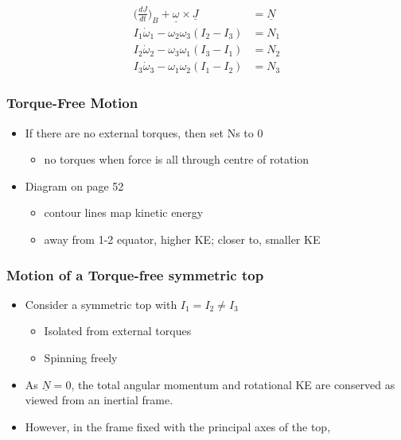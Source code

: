 \documentclass[a4paper,11pt,normalem]{article}
\begin{document}
\[
    \begin{aligned}
    \Big(\frac{d\underline{J}}{dt}\Big)_{B} + \underline{\omega_{}} \times \underline{J} &= \underline{N} \\
    I_1\dot{\omega}_1 - \omega_2\omega_3(I_2 - I_3) &= N_1 \\
    I_2\dot{\omega}_2 - \omega_3\omega_1(I_3 - I_1) &= N_2 \\
    I_3\dot{\omega}_3 - \omega_1\omega_2(I_1 - I_2) &= N_3
    \end{aligned}
\]

\subsubsection{Torque-Free Motion}\label{torque-free-motion}

\begin{itemize}
\item
  If there are no external torques, then set Ns to 0
  \begin{itemize}
  \item
    no torques when force is all through centre of rotation
  \end{itemize}
\item
  Diagram on page 52
  \begin{itemize}
  \item
    contour lines map kinetic energy
  \item
    away from 1-2 equator, higher KE; closer to, smaller KE
  \end{itemize}
\end{itemize}

\subsubsection{Motion of a Torque-free symmetric top}\label{motion-of-a-torque-free-symmetric-top}

\begin{itemize}
\item
  Consider a symmetric top with \(I_1 = I_2 \neq I_3\)
  \begin{itemize}
  \item
    Isolated from external torques
  \item
    Spinning freely
  \end{itemize}
\item
  As \(\underline{N} = 0\), the total angular momentum and rotational KE
  are conserved as viewed from an inertial frame.
\item
  However, in the frame fixed with the principal axes of the top,
\end{itemize}
\end{document}
